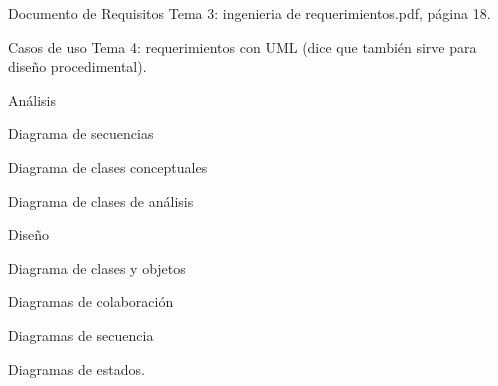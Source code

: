 \documentclass{article}
\begin{document}
\begin{section}{Documento de Requisitos}
Tema 3: ingenieria de requerimientos.pdf, página 18.
\end{section}

\begin{section}{Casos de uso}
Tema 4: requerimientos con UML (dice que también sirve para diseño procedimental).
\end{section}

\begin{section}{Análisis}
  \begin{subsection}{Diagrama de secuencias}
  \end{subsection}

  \begin{subsection}{Diagrama de clases conceptuales}  
  \end{subsection}

  \begin{subsection}{Diagrama de clases de análisis}
  \end{subsection}
\end{section}

\begin{section}{Diseño}
  \begin{subsection}{Diagrama de clases y objetos}
  \end{subsection}

  \begin{subsection}{Diagramas de colaboración}
  \end{subsection}

  \begin{subsection}{Diagramas de secuencia}
  \end{subsection}

  \begin{subsection}{Diagramas de estados.}
  \end{subsection}
\end{section}

\end{document}
